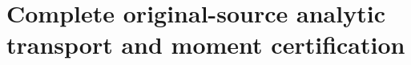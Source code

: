 \clearpage\part{Complete original-source analytic transport and moment certification}
\begingroup

\clearpage\begingroup

\endgroup
\clearpage\begingroup

\endgroup
\clearpage\begingroup

\endgroup
\clearpage\begingroup

\endgroup
\clearpage\begingroup

\endgroup
\clearpage\begingroup

\endgroup
\clearpage\begingroup

\endgroup
\clearpage\begingroup

\endgroup
\clearpage\begingroup

\endgroup
\endgroup

\clearpage

